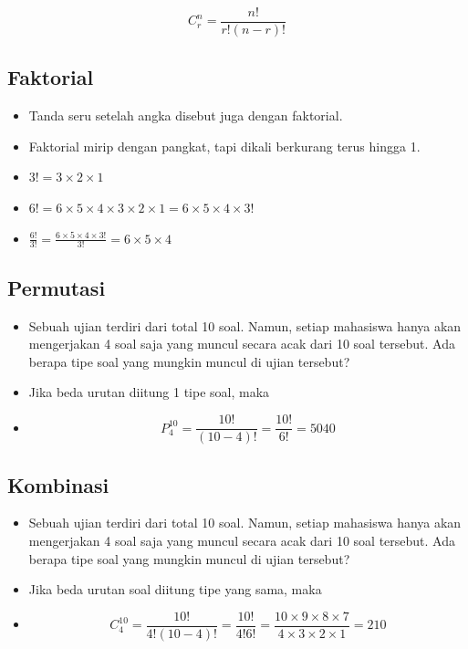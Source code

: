 \documentclass[
  letterpaper,
  DIV=11,
  numbers=noendperiod]{scrartcl}
\begin{document}
\[
C^n_r=\frac{n!}{r!(n-r)!}
\]

\hypertarget{faktorial}{%
\subsection{Faktorial}\label{faktorial}}

\begin{itemize}
\item
  Tanda seru setelah angka disebut juga dengan faktorial.
\item
  Faktorial mirip dengan pangkat, tapi dikali berkurang terus hingga 1.
\item
  \(3!=3\times 2\times 1\)
\item
  \(6!=6\times 5\times 4 \times 3 \times 2 \times 1=6 \times 5 \times 4 \times 3!\)
\item
  \(\frac{6!}{3!}=\frac{6 \times 5 \times 4 \times 3!}{3!}=6 \times 5 \times 4\)
\end{itemize}

\hypertarget{permutasi}{%
\subsection{Permutasi}\label{permutasi}}

\begin{itemize}
\item
  Sebuah ujian terdiri dari total 10 soal. Namun, setiap mahasiswa hanya
  akan mengerjakan 4 soal saja yang muncul secara acak dari 10 soal
  tersebut. Ada berapa tipe soal yang mungkin muncul di ujian tersebut?
\item
  Jika beda urutan diitung 1 tipe soal, maka
\item
  \[P^{10}_4=\frac{10!}{(10-4)!}=\frac{10!}{6!}=5040\]
\end{itemize}

\hypertarget{kombinasi}{%
\subsection{Kombinasi}\label{kombinasi}}

\begin{itemize}
\item
  Sebuah ujian terdiri dari total 10 soal. Namun, setiap mahasiswa hanya
  akan mengerjakan 4 soal saja yang muncul secara acak dari 10 soal
  tersebut. Ada berapa tipe soal yang mungkin muncul di ujian tersebut?
\item
  Jika beda urutan soal diitung tipe yang sama, maka
\item
  \[C^{10}_4=\frac{10!}{4!(10-4)!}=\frac{10!}{4!6!}=\frac{10\times9\times 8\times 7}{4 \times 3\times 2\times 1}=210\]
\end{itemize}
\end{document}
